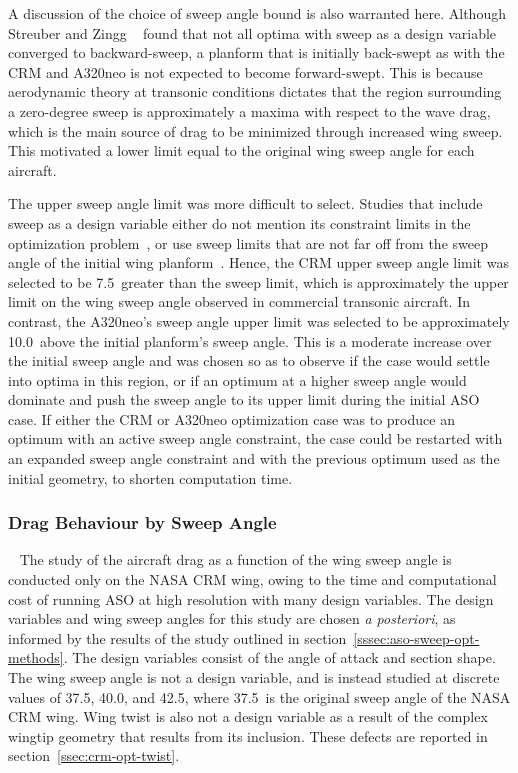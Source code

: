 A discussion of the choice of sweep angle bound is also warranted here. Although Streuber and Zingg ~\cite{streuber_efficiency_2022} found that not all optima with sweep as a design variable converged to backward-sweep, a planform that is initially back-swept as with the CRM and A320neo is not expected to become forward-swept. This is because aerodynamic theory at transonic conditions dictates that the region surrounding a zero-degree sweep is approximately a maxima with respect to the wave drag, which is the main source of drag to be minimized through increased wing sweep. This motivated a lower limit equal to the original wing sweep angle for each aircraft.

The upper sweep angle limit was more difficult to select. Studies that include sweep as a design variable either do not mention its constraint limits in the optimization problem~\cite{streuber_investigation_2017,streuber_evaluating_2021}, or use sweep limits that are not far off from the sweep angle of the initial wing planform~\cite{koo_investigation_2018}. Hence, the CRM upper sweep angle limit was selected to be 7.5\degree\ greater than the sweep limit, which is approximately the upper limit on the wing sweep angle observed in commercial transonic aircraft. In contrast, the A320neo's sweep angle upper limit was selected to be approximately 10.0\degree\ above the initial planform's sweep angle. This is a moderate increase over the initial sweep angle and was chosen so as to observe if the case would settle into optima in this region, or if an optimum at a higher sweep angle would dominate and push the sweep angle to its upper limit during the initial ASO case. If either the CRM or A320neo optimization case was to produce an optimum with an active sweep angle constraint, the case could be restarted with an expanded sweep angle constraint and with the previous optimum used as the initial geometry, to shorten computation time.

\subsubsection{Drag Behaviour by Sweep Angle}
~\label{sssec:drag-opt-methods}
The study of the aircraft drag as a function of the wing sweep angle is conducted only on the NASA CRM wing, owing to the time and computational cost of running ASO at high resolution with many design variables. The design variables and wing sweep angles for this study are chosen \textit{a posteriori}, as informed by the results of the study outlined in section~\ref{sssec:aso-sweep-opt-methods}. The design variables consist of the angle of attack and section shape. The wing sweep angle is not a design variable, and is instead studied at discrete values of 37.5\degree, 40.0\degree, and 42.5\degree, where 37.5\degree\ is the original sweep angle of the NASA CRM wing. Wing twist is also not a design variable as a result of the complex wingtip geometry that results from its inclusion. These defects are reported in section~\ref{ssec:crm-opt-twist}.